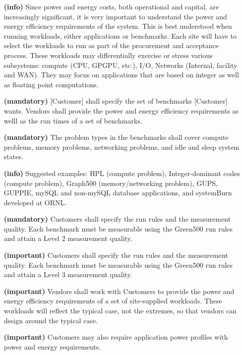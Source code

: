 \begin{itemize}

\item[\textbf{(info)}]
Since power and energy costs, both operational and capital, are increasingly significant, 
it is very important to understand the power and energy efficiency requirements of the system.  
This is best understood when running workloads, either applications or benchmarks.  
Each site will have to select the workloads to run as part of the procurement and 
acceptance process.  These workloads may differentially exercise or stress various 
subsystems: compute (CPU, GPGPU, etc.), I/O, Networks (Internal, facility and WAN).  
They may focus on applications that are based on integer as well as floating point computations.

\item[\textbf{(mandatory)}]
[Customer] shall specify the set of benchmarks [Customer] wants. Vendors shall 
provide the power and energy efficiency requirements as welll as the run times 
of a set of benchmarks. 

\item[\textbf{(mandatory)}]
The problem types in the benchmarks shall cover compute problems, memory problems, 
networking problems, and idle and sleep system states.

\item[\textbf{(info)}]
Suggested examples: HPL (compute problem), Integer-dominant codes (compute problem), 
Graph500 (memory/networking problem), GUPS, GUPPIE,  mySQL and non-mySQL database 
applications, and systemBurn developed at ORNL. 

\item[\textbf{(mandatory)}]
Customers shall specify the run rules and the measurement quality. Each benchmark 
must be measurable using the Green500 run rules and attain a Level 2 measurement quality. 

\item[\textbf{(important)}]
Customers shall specify the run rules and the measurement quality. Each benchmark 
must be measurable using the Green500 run rules and attain a Level 3 measurement quality. 

\item[\textbf{(important)}]
Vendors shall work with Customers to provide the power and energy efficiency requirements 
of a set of site-supplied workloads. These workloads will reflect the typical case, 
not the extremes, so that vendors can design around the typical case. 

\item[\textbf{(important)}]
Customers may also require application power profiles with power and energy requirements.
\end{itemize}

